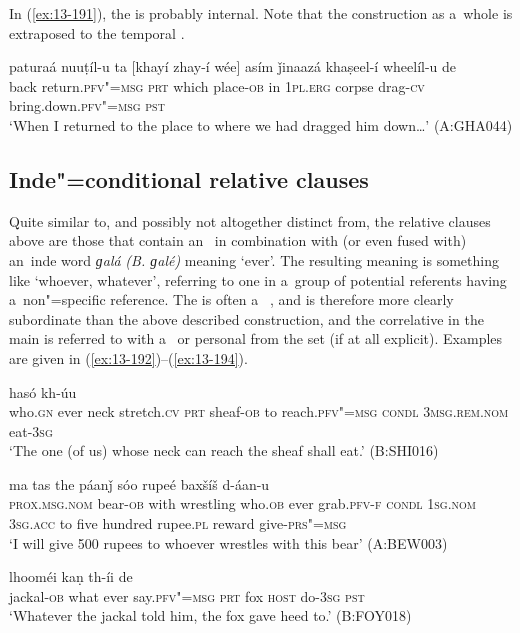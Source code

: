 In (\ref{ex:13-191}), the  is probably internal. Note that the construction as a~whole is extraposed to the temporal .

\begin{exe}
\ex
\label{ex:13-191}
\gll paturaá nuuṭíl-u ta [khayí zhay-í wée] asím  ǰinaazá khaṣeel-í wheelíl-u de \\
back return.\textsc{pfv"=msg} \textsc{prt} which place-\textsc{ob} in \textsc{1pl.erg} corpse drag-\textsc{cv}  bring.down.\textsc{pfv"=msg} \textsc{pst}   \\
\glt `When I returned to the place to where we had dragged him down{\ldots}' (A:GHA044)
\end{exe}

\subsection{Inde"=conditional relative clauses}
\label{subsec:13-6-2}

Quite similar to, and possibly not altogether distinct from, the relative clauses above are those that contain an~  in combination with (or even fused with) an~inde word \textit{ɡalá} \textit{(B. ɡalé)} meaning `ever'. The resulting meaning is something like `whoever, whatever', referring to one in a~group of potential referents having a~non"=specific reference. The  is often a~ , and is therefore more clearly subordinate than the above described construction, and the correlative in the main  is referred to with a~ or personal  from the  set (if at all explicit). Examples are given in (\ref{ex:13-192})--(\ref{ex:13-194}).

\begin{exe}
\ex
\label{ex:13-192}
 hasó kh-úu \\
who.\textsc{gn} ever neck stretch.\textsc{cv} \textsc{prt} sheaf-\textsc{ob} to  reach.\textsc{pfv"=msg} \textsc{condl} \textsc{3msg.rem.nom} eat-\textsc{3sg} \\
\glt `The one (of us) whose neck can reach the sheaf shall eat.' (B:SHI016)

\ex
\label{ex:13-193}
 ma tas
the páanǰ sóo rupeé baxšíš  d-áan-u \\
\textsc{prox.msg.nom}{\protect\footnotemark} bear-\textsc{ob} with wrestling who.\textsc{ob} ever grab.\textsc{pfv-f} \textsc{condl} \textsc{1sg.nom} \textsc{3sg.acc} to five hundred rupee.\textsc{pl} reward give-\textsc{prs"=msg} \\
\glt `I will give 500 rupees to whoever wrestles with this bear' (A:BEW003)

\ex
\label{ex:13-194}
 lhooméi kaṇ  th-íi de \\
jackal-\textsc{ob} what ever say.\textsc{pfv"=msg} \textsc{prt} fox \textsc{host} do-\textsc{3sg} \textsc{pst} \\
\glt `Whatever the jackal told him, the fox gave heed to.' (B:FOY018) 
\end{exe}


